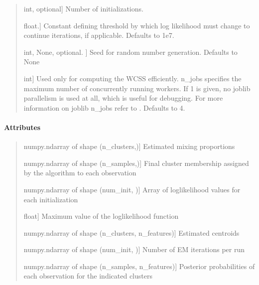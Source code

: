 \documentclass[letterpaper,10pt,english,openany,oneside]{sphinxmanual}
\begin{document}
\begin{fulllineitems}
\begin{quote}
\begin{description}
\sphinxlineitem{num\_init}{[}int, optional{]}
\sphinxAtStartPar
Number of initializations.

\sphinxlineitem{tol}{[}float.{]}
\sphinxAtStartPar
Constant defining threshold by which log 
likelihood must change to continue iterations, if applicable.
Defaults to 1e\sphinxhyphen{}7.

\sphinxlineitem{random\_state}{[}int, None, optional. {]}
\sphinxAtStartPar
Seed for random number generation. Defaults to None

\sphinxlineitem{n\_jobs}{[}int{]}
\sphinxAtStartPar
Used only for computing the WCSS efficiently.
n\_jobs specifies the maximum number of concurrently running workers. 
If 1 is given, no joblib parallelism is used at all, which is useful for debugging.
For more information on joblib n\_jobs refer to \sphinxhyphen{} 
.
Defaults to 4.

\end{description}
\end{quote}


\paragraph{Attributes}
\label{\detokenize{api_reference/generated/QuadratiK.spherical_clustering.PKBC:attributes}}\begin{quote}
\begin{description}
\sphinxlineitem{alpha\_}{[}numpy.ndarray of shape (n\_clusters,){]}
\sphinxAtStartPar
Estimated mixing proportions

\sphinxlineitem{labels\_}{[}numpy.ndarray of shape (n\_samples,){]}
\sphinxAtStartPar
Final cluster membership assigned by the algorithm to each observation

\sphinxlineitem{log\_lik\_vec}{[}numpy.ndarray of shape (num\_init, ){]}
\sphinxAtStartPar
Array of log\sphinxhyphen{}likelihood values for each initialization

\sphinxlineitem{loklik\_}{[}float{]}
\sphinxAtStartPar
Maximum value of the log\sphinxhyphen{}likelihood function

\sphinxlineitem{mu\_}{[}numpy.ndarray of shape (n\_clusters, n\_features){]}
\sphinxAtStartPar
Estimated centroids

\sphinxlineitem{num\_iter\_per\_run}{[}numpy.ndarray of shape (num\_init, ){]}
\sphinxAtStartPar
Number of E\sphinxhyphen{}M iterations per run

\sphinxlineitem{post\_probs\_}{[}numpy.ndarray of shape (n\_samples, n\_features){]}
\sphinxAtStartPar
Posterior probabilities of each observation for the indicated clusters


\end{description}
\end{quote}
\end{fulllineitems}
\end{document}
